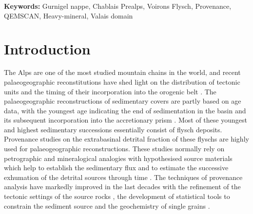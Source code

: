\documentclass[twoside]{article}
\newcommand\registred{\textsuperscript{\tiny\textregistered}}
\begin{document}
{\bf Keywords:} Gurnigel nappe, Chablais Prealps, Voirons Flysch, Provenance, QEMSCAN\registred, Heavy-mineral, Valais domain

\section{Introduction}

The Alps are one of the most studied mountain chains in the world, and recent palaeogeographic reconstitutions have shed light on the distribution of tectonic units and the timing of their incorporation into the orogenic belt \citep{Schmid1996,Schmid2004,Stampfli2002a,Stampfli2002b,Handy2010}. The palaeogeographic reconstructions of sedimentary covers are partly based on age data, with the youngest age indicating the end of sedimentation in the basin and its subsequent incorporation into the accretionary prism \citep{Stampfli2002b}. Most of these youngest and highest sedimentary successions essentially consist of flysch deposits. Provenance studies on the extrabasinal detrital fraction of these flyschs are highly used for palaeogeographic reconstructions. These studies normally rely on petrographic and mineralogical analogies with hypothesised source materials \citep{Eynatten1999,Beltran-Trivino2013} which help to establish the sedimentary flux and to estimate the successive exhumation of the detrital sources through time \citep{Trautwein2001a}. The techniques of provenance analysis have markedly improved in the last decades with the refinement of the tectonic settings of the source rocks \citep{Dickinson1979a,Dickinson1983,Dickinson1985}, the development of statistical tools to constrain the sediment source \citep{Garzanti2004,Garzanti2007a,Garzanti2007b,Garzanti2010} and the geochemistry of single grains \citep{Eynatten2012}.\par
\medskip

\end{document}
